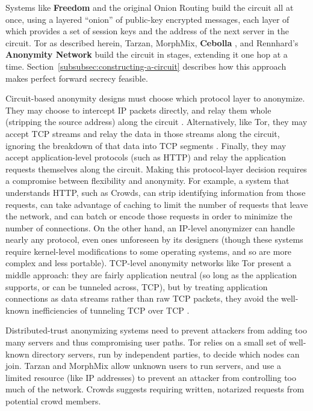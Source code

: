 \documentclass[times,10pt,twocolumn]{article}
\begin{document}
Systems like {\bf Freedom} and the original Onion Routing build the circuit
all at once, using a layered ``onion'' of public-key encrypted messages,
each layer of which provides a set of session keys and the address of the
next server in the circuit. Tor as described herein, Tarzan, MorphMix,
{\bf Cebolla} \cite{cebolla}, and Rennhard's {\bf Anonymity Network} \cite{anonnet}
build the circuit
in stages, extending it one hop at a time.
Section~\ref{subsubsec:constructing-a-circuit} describes how this
approach makes perfect forward secrecy feasible.

Circuit-based anonymity designs must choose which protocol layer
to anonymize. They may choose to intercept IP packets directly, and
relay them whole (stripping the source address) along the circuit
\cite{freedom2-arch,tarzan:ccs02}.  Alternatively, like
Tor, they may accept TCP streams and relay the data in those streams
along the circuit, ignoring the breakdown of that data into TCP segments
\cite{morphmix:fc04,anonnet}. Finally, they may accept application-level
protocols (such as HTTP) and relay the application requests themselves
along the circuit.  
Making this protocol-layer decision requires a compromise between flexibility
and anonymity.  For example, a system that understands HTTP, such as Crowds,
can strip
identifying information from those requests, can take advantage of caching
to limit the number of requests that leave the network, and can batch
or encode those requests in order to minimize the number of connections.
On the other hand, an IP-level anonymizer can handle nearly any protocol,
even ones unforeseen by its designers (though these systems require
kernel-level modifications to some operating systems, and so are more
complex and less portable). TCP-level anonymity networks like Tor present
a middle approach: they are fairly application neutral (so long as the
application supports, or can be tunneled across, TCP), but by treating
application connections as data streams rather than raw TCP packets,
they avoid the well-known inefficiencies of tunneling TCP over TCP
\cite{tcp-over-tcp-is-bad}.

Distributed-trust anonymizing systems need to prevent attackers from
adding too many servers and thus compromising user paths.
Tor relies on a small set of well-known directory servers, run by
independent parties, to decide which nodes can
join. Tarzan and MorphMix allow unknown users to run servers, and use
a limited resource (like IP addresses) to prevent an attacker from
controlling too much of the network.  Crowds suggests requiring
written, notarized requests from potential crowd members.
\end{document}
